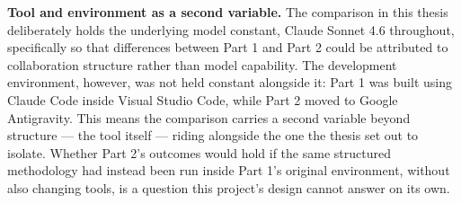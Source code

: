 \textbf{Tool and environment as a second variable.} The comparison in this thesis deliberately holds the underlying model constant, Claude Sonnet 4.6 throughout, specifically so that differences between Part 1 and Part 2 could be attributed to collaboration structure rather than model capability. The development environment, however, was not held constant alongside it: Part 1 was built using Claude Code inside Visual Studio Code, while Part 2 moved to Google Antigravity. This means the comparison carries a second variable beyond structure --- the tool itself --- riding alongside the one the thesis set out to isolate. Whether Part 2's outcomes would hold if the same structured methodology had instead been run inside Part 1's original environment, without also changing tools, is a question this project's design cannot answer on its own.

